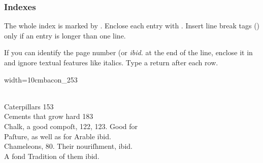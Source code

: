 \subsubsection{Indexes}
\label{section indexes}

\begin{mainrule}
  The whole index is marked by . Enclose each entry with . Insert line break tags () only if an entry is longer than one line.

  If you can identify the page number (or \emph{ibid.} at the end of the line, enclose it in  and ignore textual features like italics. Type a return after each row.
\end{mainrule}



\begin{sampleImageSmall}[ 1]{width=10cm}{bacon_253}

\begin{typeLatin}
 \\
Caterpillars  153 \\
Cements that grow hard  183 \\
Chalk, a good compoſt, 122, 123. Good for \\
Paſture, as well as for Arable  ibid. \\
Chameleons, 80. Their nouriſhment,  ibid. \\
A fond Tradition of them ibid. \\
\end{typeLatin}
\end{sampleImageSmall}


